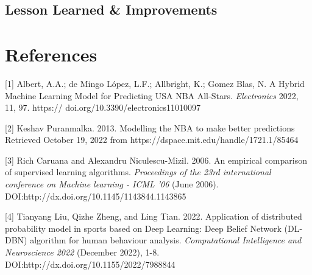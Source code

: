\documentclass{article}
\begin{document}
\subsection{Lesson Learned \& Improvements}


\clearpage
\section*{References}
\medskip
\small
[1] Albert, A.A.; de Mingo
López, L.F.; Allbright, K.; Gomez Blas,
N. A Hybrid Machine Learning Model
for Predicting USA NBA All-Stars.
\textit{Electronics} 2022, 11, 97. https://
doi.org/10.3390/electronics11010097

[2] Keshav Puranmalka. 2013. Modelling the NBA to make better predictions Retrieved October 19, 2022 from https://dspace.mit.edu/handle/1721.1/85464 

[3] Rich Caruana and Alexandru Niculescu-Mizil. 2006. An empirical comparison of supervised learning algorithms. \textit{Proceedings of the 23rd international conference on Machine learning  - ICML '06} (June 2006). DOI:http://dx.doi.org/10.1145/1143844.1143865 

[4] Tianyang Liu, Qizhe Zheng, and Ling Tian. 2022. Application of distributed probability model in sports based on Deep Learning: Deep Belief Network (DL-DBN) algorithm for human behaviour analysis. \textit{Computational Intelligence and Neuroscience 2022} (December 2022), 1-8. DOI:http://dx.doi.org/10.1155/2022/7988844 
\end{document}
